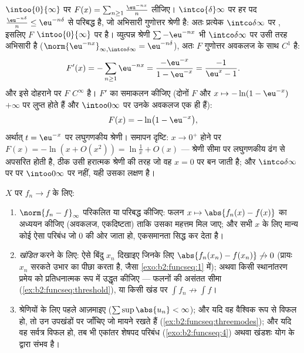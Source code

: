 \begin{example}[एक लघुगणकीय श्रेणी, अंत तक की हुई]\label{ex:b2:funcseq:logseries}
$\intoo{0}{\infty}$ पर $F(x) = \sum_{n\geq1} \frac{\eu^{-nx}}{n}$ लीजिए। $\intco{\delta}
\infty$ पर हर पद $\frac{\eu^{-n\delta}}{n} \leq \eu^{-n\delta}$ से परिबद्ध है, जो अभिसारी गुणोत्तर
श्रेणी है: अतः प्रत्येक $\intco\delta\infty$ पर , इसलिए $F$ $\intoo{0}{\infty}$ पर  है।
व्युत्पन्न श्रेणी $\sum -\eu^{-nx}$ भी $\intco\delta\infty$ पर उसी तरह  अभिसारी है ($\norm{\eu^{-nx}}_{\infty,\intco\delta\infty} =
\eu^{-n\delta}$),
अतः $F$ गुणोत्तर अवकलज के साथ $C^1$ है:
\[
F'(x) = -\sum_{n\geq1}\eu^{-nx}
= \frac{-\eu^{-x}}{1 - \eu^{-x}}
= \frac{-1}{\eu^{x} - 1} .
\]
और इसे दोहराने पर $F$ $C^\infty$ है। $F'$ का समाकलन कीजिए (दोनों $F$ और $x
\mapsto -\ln(1 - \eu^{-x})$
$+\infty$ पर लुप्त होते हैं और $\intoo0\infty$ पर उनके अवकलज एक ही हैं):
\[
F(x) = -\ln\bigl(1 - \eu^{-x}\bigr),
\]
अर्थात् $t = \eu^{-x}$ पर लघुगणकीय श्रेणी। समापन दृष्टि: $x
\to 0^+$ होने पर $F(x) = -\ln(x + O(x^2)) = \ln\frac1x + O(x)$ ---
श्रेणी सीमा पर लघुगणकीय ढंग से अपसरित होती है, ठीक उसी हरात्मक श्रेणी की
तरह जो वह $x = 0$ पर बन जाती है; और $\intco\delta\infty$ पर  पर $\intoo0\infty$ पर नहीं,
यही उसका लक्षण है।
\end{example}

\begin{method}\label{met:b2:funcseq:uniform}
$X$ पर  $f_n \to f$ के लिए:
\begin{enumerate}
  \item $\norm{f_n - f}_\infty$ परिकलित या परिबद्ध कीजिए: फलन $x \mapsto \abs{f_n(x) - f(x)}$ का अध्ययन कीजिए (अवकलज,
        एकदिष्टता) ताकि उसका महत्तम मिल जाए; और सभी $x$ के लिए मान्य
        कोई ऐसा परिबंध जो $0$ की ओर जाता हो, एकसमानता सिद्ध कर देता है।
  \item \emph{खंडित} करने के लिए: ऐसे बिंदु $x_n$ दिखाइए जिनके लिए $\abs{f_n(x_n) - f(x_n)} \not\to 0$
        (प्रायः $x_n$ सरकते उभार का पीछा करता है, जैसा \cref{exo:b2:funcseq:1} में); अथवा
        किसी स्थानांतरण प्रमेय को प्रतिधनात्मक रूप में उद्धृत कीजिए ---
         फलनों की असंतत सीमा (\cref{ex:b2:funcseq:threshold}), या किसी खंड पर $\int f_n
        \not\to \int f$।
  \item श्रेणियों के लिए पहले  आज़माइए ($\sum\sup\abs{u_n} < \infty$); और यदि वह
        वैश्विक रूप से विफल हो, तो उन उपखंडों पर जाँचिए जो मायने रखते
        हैं (\cref{ex:b2:funcseq:threemodes}); और यदि वह सर्वत्र विफल हो, तब भी एकांतर शेषपद
        परिबंध (\cref{exo:b2:funcseq:4}) अथवा खंडशः योग के द्वारा  संभव है।
\end{enumerate}
\end{method}

